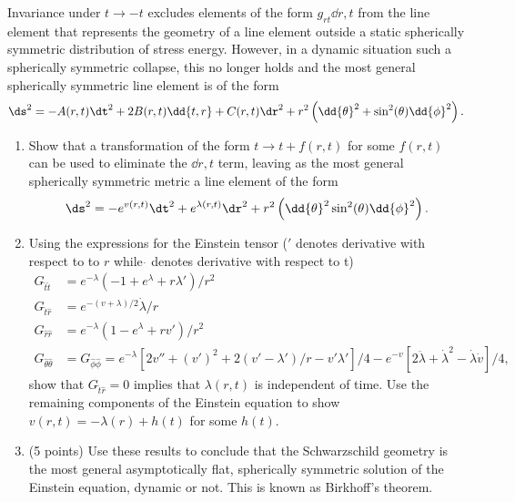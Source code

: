 \begin{problem}
  Invariance under $t \rightarrow -t$ excludes elements of the form $g_{rt} \dd{r,t}$ from the line element that represents the geometry of a line element outside a static spherically symmetric distribution of stress energy. However, in a dynamic situation such a spherically symmetric collapse, this no longer holds and the most general spherically symmetric line element is of the form
  \[%
    \ds^2 = -A(r, t)\dt^2 + 2B(r, t)\dd{t,r} + C(r, t)\dr^2 + r^2\left(\dd{\theta}^2 + \sin^2(\theta)\dd{\phi}^2\right)
  .\]%
  \begin{enumerate}
    \item Show that a transformation of the form $t \rightarrow t + f(r, t)$ for some $f(r, t)$ can be used to eliminate the $\dd{r,t}$ term, leaving as the most general spherically symmetric metric a line element of the form
      \[%
        \ds^2 = -e^{v(r,t)}\dt^2 + e^{\lambda(r,t)}\dr^2 + r^2\left(\dd{\theta}^2\sin^2(\theta)\dd{\phi}^2\right)
      .\]%
    \item Using the expressions for the Einstein tensor ($'$ denotes derivative with respect to to $r$ while $\dot{\phantom{ }}$ denotes derivative with respect to t)
      \begin{align*}
        G_{\hat{t}\hat{t}} &= e^{-\lambda}\left(-1 + e^\lambda + r\lambda'\right)/r^2 \\
        G_{\hat{t}\hat{r}} &= e^{-(v+\lambda)/2}\dot{\lambda}/r \\
        G_{\hat{r}\hat{r}} &= e^{-\lambda}\left(1 - e^\lambda + rv'\right)/r^2 \\
        G_{\hat{\theta}\hat{\theta}} &= G_{\hat{\phi}\hat{\phi}} =
        e^{-\lambda}\left[2v'' + (v')^2 + 2(v' - \lambda')/r - v'\lambda'\right]/4 - e^{-v}\left[2\ddot{\lambda} + \dot{\lambda}^2 - \dot{\lambda}\dot{v}\right]/4
      ,\end{align*}
      show that $G_{\hat{t}\hat{r}} = 0$ implies that $\lambda(r, t)$ is independent of time. Use the remaining components of the Einstein equation to show $v(r, t) = -\lambda(r) + h(t)$ for some $h(t)$.
    \item (5 points) Use these results to conclude that the Schwarzschild geometry is the most general asymptotically flat, spherically symmetric solution of the Einstein equation, dynamic or not. This is known as Birkhoff's theorem.
  \end{enumerate}
\end{problem}


